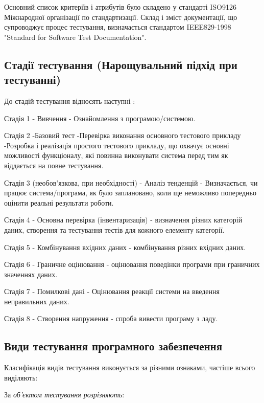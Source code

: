 Основний список критеріїв і атрибутів було складено
у стандарті ISO9126 Міжнародної організації по стандартизації.
Склад і зміст документації, що супроводжує процес тестування,
визначається стандартом IEEE829-1998 "Standard for Software Test Documentation".

\subsection{Стадії тестування (Нарощувальний підхід при тестуванні)}

До стадій тестування відносять наступні \cite{testing-black,iso-software-eng}:

Стадія 1 - Вивчення - Ознайомлення з програмою/системою.

Стадія 2 -Базовий тест -Перевірка виконання основного тестового прикладу 
-Розробка і реалізація простого тестового прикладу,
що охвачує основні можливості функціоналу, які повинна виконувати система
перед тим як віддається на повне тестування.

Стадія 3 (необов’язкова, при необхідності) - Аналіз тенденцій
- Визначається, чи працює система/програма, як було заплановано,
коли ще неможливо попередньо оцінити реальні результати роботи.

Стадія 4 - Основна перевірка (інвентаризація) - визначення різних категорій даних,
створення та тестування тестів для кожного елементу категорії.

Стадія 5 - Комбінування вхідних даних - комбінування різних вхідних даних.

Стадія 6 - Граничне оцінювання - оцінювання поведінки програми при граничних значеннях даних.

Стадія 7 - Помилкові дані - Оцінювання реакції системи на введення неправильних даних.

Стадія 8 - Створення напруження - спроба вивести програму з ладу.

\subsection{Види тестування програмного забезпечення}

Класифікація видів тестування виконується за різними ознаками,
частіше всього виділяють:

За \emph{об’єктом тестування розрізняють}:


